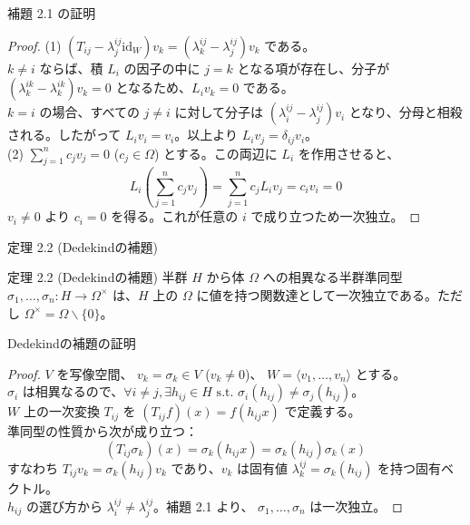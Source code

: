 \documentclass[aspectratio=169,11pt,unicode]{beamer}
\begin{document}
\begin{frame}{補題 2.1 の証明}
\begin{proof}
(1) $(T_{ij} - \lambda^{ij}_j \mathrm{id}_W) v_k = (\lambda^{ij}_k - \lambda^{ij}_j) v_k$ である。\\
$k \neq i$ ならば、積 $L_i$ の因子の中に $j=k$ となる項が存在し、分子が $(\lambda^{ik}_k - \lambda^{ik}_k) v_k = 0$ となるため、$L_i v_k = 0$ である。\\
$k = i$ の場合、すべての $j \neq i$ に対して分子は $(\lambda^{ij}_i - \lambda^{ij}_j) v_i$ となり、分母と相殺される。したがって $L_i v_i = v_i$。以上より $L_i v_j = \delta_{ij} v_i$。\\
\vspace{0.1cm}
(2) $\sum_{j=1}^n c_j v_j = 0$ ($c_j \in \Omega$) とする。この両辺に $L_i$ を作用させると、
\[ L_i \left( \sum_{j=1}^n c_j v_j \right) = \sum_{j=1}^n c_j L_i v_j = c_i v_i = 0 \]
$v_i \neq 0$ より $c_i = 0$ を得る。これが任意の $i$ で成り立つため一次独立。
\end{proof}
\end{frame}

\begin{frame}{定理 2.2 (Dedekindの補題)}
\begin{block}{定理 2.2 (Dedekindの補題)}
半群 $H$ から体 $\Omega$ への相異なる半群準同型 $\sigma_1, \dots, \sigma_n : H \to \Omega^\times$ は、$H$ 上の $\Omega$ に値を持つ関数達として一次独立である。ただし $\Omega^\times = \Omega \smallsetminus \{0\}$。
\end{block}
\end{frame}

\begin{frame}{Dedekindの補題の証明}
\begin{proof}
$V$ を写像空間、 $v_k = \sigma_k \in V$ ($v_k \neq 0$)、 $W = \langle v_1, \dots, v_n \rangle$ とする。\\
$\sigma_i$ は相異なるので、$\forall i \neq j, \exists h_{ij} \in H \text{ s.t. } \sigma_i(h_{ij}) \neq \sigma_j(h_{ij})$。\\
$W$ 上の一次変換 $T_{ij}$ を $(T_{ij} f)(x) = f(h_{ij} x)$ で定義する。\\
準同型の性質から次が成り立つ：
\[ (T_{ij} \sigma_k)(x) = \sigma_k(h_{ij} x) = \sigma_k(h_{ij}) \sigma_k(x) \]
すなわち $T_{ij} v_k = \sigma_k(h_{ij}) v_k$ であり、$v_k$ は固有値 $\lambda^{ij}_k = \sigma_k(h_{ij})$ を持つ固有ベクトル。\\
$h_{ij}$ の選び方から $\lambda^{ij}_i \neq \lambda^{ij}_j$。補題 2.1 より、 $\sigma_1, \dots, \sigma_n$ は一次独立。
\end{proof}
\end{frame}
\end{document}
